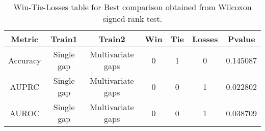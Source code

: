 \begin{table}[H]
\centering
\begin{tabular}{|c|c|c|c|c|c|c|}

\textbf{Metric} & \textbf{Train1} &    \textbf{Train2} &  \textbf{Win} &  \textbf{Tie} &  \textbf{Losses} &  \textbf{Pvalue} \\
\hline

       Accuracy &      Single gap &  Multivariate gaps &             0 &             1 &                0 &         0.145087 \\
\hline
          AUPRC &      Single gap &  Multivariate gaps &             0 &             0 &                1 &         0.022802 \\
\hline
          AUROC &      Single gap &  Multivariate gaps &             0 &             0 &                1 &         0.038709 \\
\hline

\end{tabular}
\caption{Win-Tie-Losses table for Best comparison obtained from Wilcoxon signed-rank test.}
\label{tab:best_comparison_knn_vs_cae_vs_cnn}
\end{table}